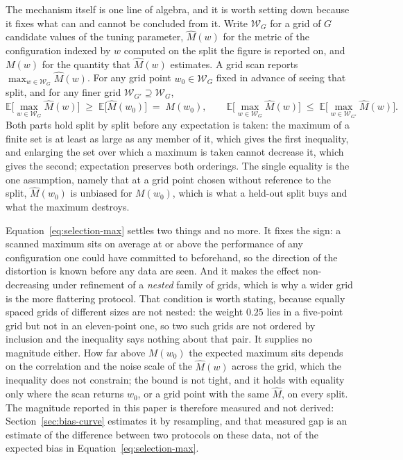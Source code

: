 The mechanism itself is one line of algebra, and it is worth setting down
because it fixes what can and cannot be concluded from it. Write
\(\mathcal{W}_G\) for a grid of \(G\) candidate values of the tuning
parameter, \(\widehat{M}(w)\) for the metric of the configuration indexed by
\(w\) computed on the split the figure is reported on, and \(M(w)\) for the
quantity that \(\widehat{M}(w)\) estimates. A grid scan reports
\(\max_{w \in \mathcal{W}_G} \widehat{M}(w)\). For any grid point
\(w_0 \in \mathcal{W}_G\) fixed in advance of seeing that split, and for any
finer grid \(\mathcal{W}_{G'} \supseteq \mathcal{W}_G\),
\begin{equation}
\label{eq:selection-max}
\mathbb{E}\Big[\max_{w \in \mathcal{W}_G} \widehat{M}(w)\Big]
  \;\ge\; \mathbb{E}\big[\widehat{M}(w_0)\big] \;=\; M(w_0),
\qquad
\mathbb{E}\Big[\max_{w \in \mathcal{W}_G} \widehat{M}(w)\Big]
  \;\le\; \mathbb{E}\Big[\max_{w \in \mathcal{W}_{G'}} \widehat{M}(w)\Big].
\end{equation}
Both parts hold split by split before any expectation is taken: the maximum of
a finite set is at least as large as any member of it, which gives the first
inequality, and enlarging the set over which a maximum is taken cannot decrease
it, which gives the second; expectation preserves both orderings. The single
equality is the one assumption, namely that at a grid point chosen without
reference to the split, \(\widehat{M}(w_0)\) is unbiased for \(M(w_0)\),
which is what a held-out split buys and what the maximum destroys.

Equation~\eqref{eq:selection-max} settles two things and no more. It fixes the
sign: a scanned maximum sits on average at or above the performance of any
configuration one could have committed to beforehand, so the direction of the
distortion is known before any data are seen. And it makes the effect
non-decreasing under refinement of a \emph{nested} family of grids, which is
why a wider grid is the more flattering protocol. That condition is worth
stating, because equally spaced grids of different sizes are not nested: the
weight \(0.25\) lies in a five-point grid but not in an eleven-point one, so
two such grids are not ordered by inclusion and the inequality says nothing
about that pair. It supplies no magnitude either. How far above \(M(w_0)\) the
expected maximum sits depends on the correlation and the noise scale of the
\(\widehat{M}(w)\) across the grid, which the inequality does not constrain;
the bound is not tight, and it holds with equality only where the scan returns
\(w_0\), or a grid point with the same \(\widehat{M}\), on every split. The magnitude reported in this paper is
therefore measured and not derived: Section~\ref{sec:bias-curve} estimates it by resampling, and
that measured gap is an estimate of the difference between two protocols on
these data, not of the expected bias in
Equation~\eqref{eq:selection-max}.

